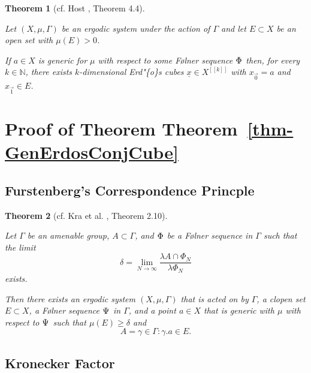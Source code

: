 \documentclass[
  british,
]{article}
\theoremstyle{definition}
\theoremstyle{plain}
\theoremstyle{plain}
\newtheorem{theorem}{Theorem}[section]
\theoremstyle{remark}
\newcommand{\AmenableGroup}{{\Gamma}}
\newcommand{\Measure}{{\mu}}
\newcommand{\ShiftSpace}{{X}}
\newcommand{\Folner}[1][\vphantom{}]{{\Phi}_{#1}}
\newcommand{\FurstenbergFolner}[1][{\vphantom{}}]{{\Psi}_{#1}}
\newcommand{\GroupAction}[2]{{#1}.{#2}}
\newcommand{\AmenableGroupElement}{{\gamma}}
\newcommand{\CountingMeasure}{{\lambda}}
\newcommand{\N}{\mathbb{N}}
\begin{document}
\begin{theorem}[cf. Host , Theorem
4.4]\protect\hypertarget{thm-GenNErdosConjCube}{}\label{thm-GenNErdosConjCube}

Let \((X,\Measure,\AmenableGroup)\) be an ergodic system under the
action of \(\AmenableGroup\) and let \(E\subset X\) be an open set with
\(\Measure(E)>0\).

If \(a\in X\) is generic for \(\Measure\) with respect to some Følner
sequence \(\Folner\) then, for every \(k\in\N\), there exists
\(k\)-dimensional Erd"\{o\}s cubes \(\underline{x}\in X^{[[k]]}\) with
\(x_{\vec{0}}=a\) and \(x_{\vec{1}}\in E\).

\end{theorem}

\section{\texorpdfstring{Proof of Theorem
Theorem~\ref{thm-GenErdosConjCube}}{Proof of Theorem Theorem~}}\label{proof-of-theorem-thm-generdosconjcube}

\subsection{Furstenberg's Correspondence
Princple}\label{furstenbergs-correspondence-princple}

\begin{theorem}[cf. Kra et al. ,
Theorem
2.10]\protect\hypertarget{thm-Furstenberg}{}\label{thm-Furstenberg}

Let \(\AmenableGroup\) be an amenable group,
\(A\subset \AmenableGroup\), and \(\Folner\) be a Følner sequence in
\(\AmenableGroup\) such that the limit
\[\delta=\lim_{N\rightarrow\infty}\frac{\CountingMeasure{A\cap\Folner[N]}}{\CountingMeasure{\Folner[N]}}\]
exists.

Then there exists an ergodic system
\((\ShiftSpace,\Measure,\AmenableGroup)\) that is acted on by
\(\AmenableGroup\), a clopen set \(E\subset\ShiftSpace\), a Følner
sequence \(\FurstenbergFolner\) in \(\AmenableGroup\), and a point
\(a\in\ShiftSpace\) that is generic with \(\Measure\) with respect to
\(\FurstenbergFolner\) such that \(\Measure(E)\geq\delta\) and
\[A={\AmenableGroupElement\in \AmenableGroup:\GroupAction{\AmenableGroupElement}{a}\in E}. \]

\end{theorem}

\subsection{Kronecker Factor}\label{kronecker-factor}
\end{document}
